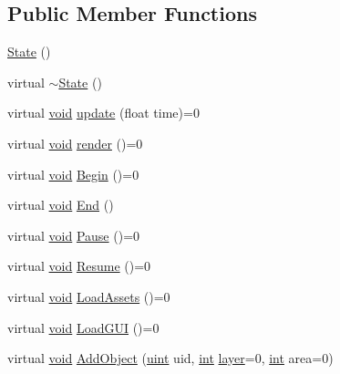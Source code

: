 \subsection*{Public Member Functions}
\begin{DoxyCompactItemize}
\item 
\hyperlink{class_state_ab91bb1dd5aa6260ab2a456581daf9ec2}{State} ()
\item 
virtual \hyperlink{class_state_a9ddc1df6f998184d6477b48fab90281c}{$\sim$\-State} ()
\item 
virtual \hyperlink{_s_d_l__opengles2__gl2ext_8h_ae5d8fa23ad07c48bb609509eae494c95}{void} \hyperlink{class_state_a6445efe57dd006dec3d5041272d4688c}{update} (float time)=0
\item 
virtual \hyperlink{_s_d_l__opengles2__gl2ext_8h_ae5d8fa23ad07c48bb609509eae494c95}{void} \hyperlink{class_state_a34e26f04dda59f19396ae4b84c5379b6}{render} ()=0
\item 
virtual \hyperlink{_s_d_l__opengles2__gl2ext_8h_ae5d8fa23ad07c48bb609509eae494c95}{void} \hyperlink{class_state_a7a2ee658bbed3ce76534b0f361227918}{Begin} ()=0
\item 
virtual \hyperlink{_s_d_l__opengles2__gl2ext_8h_ae5d8fa23ad07c48bb609509eae494c95}{void} \hyperlink{class_state_a1257ea9c7d84b2e31b27909d7cf69cf6}{End} ()
\item 
virtual \hyperlink{_s_d_l__opengles2__gl2ext_8h_ae5d8fa23ad07c48bb609509eae494c95}{void} \hyperlink{class_state_a5fc730ec6c771f86c5a6100878dc306f}{Pause} ()=0
\item 
virtual \hyperlink{_s_d_l__opengles2__gl2ext_8h_ae5d8fa23ad07c48bb609509eae494c95}{void} \hyperlink{class_state_a546fd634ce33cb867c5e8dfadb5e3ade}{Resume} ()=0
\item 
virtual \hyperlink{_s_d_l__opengles2__gl2ext_8h_ae5d8fa23ad07c48bb609509eae494c95}{void} \hyperlink{class_state_a4c9b03c8e989f36b475d6d625c0df4d0}{Load\-Assets} ()=0
\item 
virtual \hyperlink{_s_d_l__opengles2__gl2ext_8h_ae5d8fa23ad07c48bb609509eae494c95}{void} \hyperlink{class_state_a7a3468e6f6a0eb911ae28363a5347be0}{Load\-G\-U\-I} ()=0
\item 
virtual \hyperlink{_s_d_l__opengles2__gl2ext_8h_ae5d8fa23ad07c48bb609509eae494c95}{void} \hyperlink{class_state_ab1917931460de33c206f4733996e43c8}{Add\-Object} (\hyperlink{common_8hpp_a69aa29b598b851b0640aa225a9e5d61d}{uint} uid, \hyperlink{_s_d_l__thread_8h_a6a64f9be4433e4de6e2f2f548cf3c08e}{int} \hyperlink{_s_d_l__opengl__glext_8h_ae7bc0cdc2d90da1b600d6cc916c2772e}{layer}=0, \hyperlink{_s_d_l__thread_8h_a6a64f9be4433e4de6e2f2f548cf3c08e}{int} area=0)

\end{DoxyCompactItemize}
